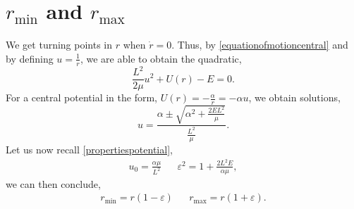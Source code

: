 \documentclass{book}
\begin{document}
\section{$r_{\text{min}}$ and $r_{\text{max}}$}
We get turning points in $r$ when $\Dot{r} = 0$. Thus, by \eqref{equationofmotioncentral} and by defining $u = \frac{1}{r}$, we are able to obtain the quadratic,
\begin{equation}
    \frac{L^2}{2\mu}u^2 + U(r) - E = 0.
\end{equation}
For a central potential in the form, $U(r) = -\frac{\alpha}{r} = -\alpha u$, we obtain solutions,
\begin{equation}
    u = \frac{\alpha \pm \sqrt{\alpha^2 + \frac{2EL^2}{\mu}}}{\frac{L^2}{\mu}}.
\end{equation}
Let us now recall \eqref{propertiespotential}, 
\begin{align}
    u_0 = \frac{\alpha \mu}{L^2} && \varepsilon^2 = 1 + \frac{2L^2E}{\alpha \mu},
\end{align}
we can then conclude,
\begin{align}
    r_\text{min} = r(1-\varepsilon) && r_{\text{max}} = r(1+\varepsilon).
\end{align}
\end{document}
